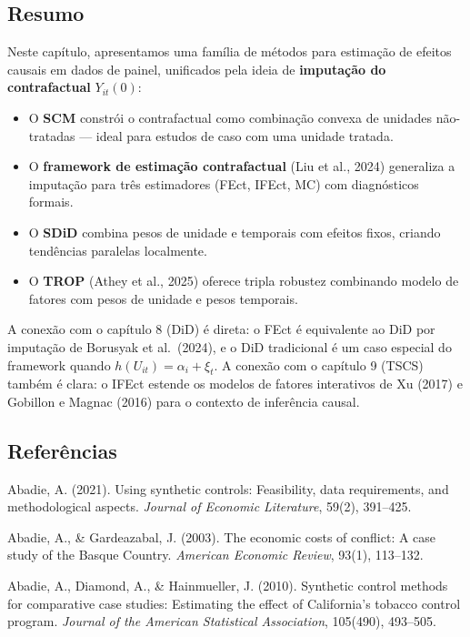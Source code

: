 \documentclass[
]{article}
\providecommand{\tightlist}{%
  \setlength{\itemsep}{0pt}\setlength{\parskip}{0pt}}
\begin{document}
\subsection{Resumo}\label{resumo-2}

Neste capítulo, apresentamos uma família de métodos para estimação de efeitos causais em dados de painel, unificados pela ideia de \textbf{imputação do contrafactual} \(Y_{it}(0)\):

\begin{itemize}
\tightlist
\item
  O \textbf{SCM} constrói o contrafactual como combinação convexa de unidades não-tratadas --- ideal para estudos de caso com uma unidade tratada.
\item
  O \textbf{framework de estimação contrafactual} (Liu et al., 2024) generaliza a imputação para três estimadores (FEct, IFEct, MC) com diagnósticos formais.
\item
  O \textbf{SDiD} combina pesos de unidade e temporais com efeitos fixos, criando tendências paralelas localmente.
\item
  O \textbf{TROP} (Athey et al., 2025) oferece tripla robustez combinando modelo de fatores com pesos de unidade e pesos temporais.
\end{itemize}

A conexão com o capítulo 8 (DiD) é direta: o FEct é equivalente ao DiD por imputação de Borusyak et al.~(2024), e o DiD tradicional é um caso especial do framework quando \(h(U_{it}) = \alpha_i + \xi_t\). A conexão com o capítulo 9 (TSCS) também é clara: o IFEct estende os modelos de fatores interativos de Xu (2017) e Gobillon e Magnac (2016) para o contexto de inferência causal.

\subsection{Referências}\label{referuxeancias-3}

Abadie, A. (2021). Using synthetic controls: Feasibility, data requirements, and methodological aspects. \emph{Journal of Economic Literature}, 59(2), 391--425.

Abadie, A., \& Gardeazabal, J. (2003). The economic costs of conflict: A case study of the Basque Country. \emph{American Economic Review}, 93(1), 113--132.

Abadie, A., Diamond, A., \& Hainmueller, J. (2010). Synthetic control methods for comparative case studies: Estimating the effect of California's tobacco control program. \emph{Journal of the American Statistical Association}, 105(490), 493--505.
\end{document}
